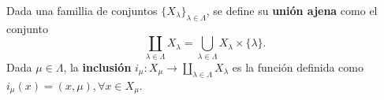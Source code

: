

\begin{definition}
Dada una famillia de conjuntos $\{ X_{\lambda} \}_{\lambda \in \Lambda}$, se define su \textbf{unión ajena} como el conjunto
\begin{equation*}
    \coprod_{\lambda \in \Lambda} X_{\lambda} = \bigcup_{\lambda \in \Lambda} X_{\lambda} \times \{ \lambda \}.
\end{equation*}
Dada $\mu \in \Lambda$, la \textbf{inclusión} $i_{\mu} : X_{\mu} \longrightarrow \coprod_{\lambda \in \Lambda} X_{\lambda}$ es la función definida como $i_{\mu}(x) = (x, \mu), \forall x \in X_{\mu}$.
\end{definition}
